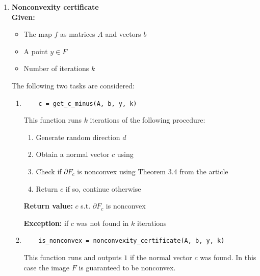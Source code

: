 \documentclass[a4paper]{article}
\theoremstyle{definition}
\begin{document}
\begin{enumerate}
\begin{enumerate}
{\bf Exception:} if optimization task failed

\item \begin{verbatim}
c = get_c_from_d(A, b, y, d)
\end{verbatim}

This function obtains the normal vector $c$ at the boundary point $y+td$ using dual problem (5) from the article.

{\bf Return value:} the normal vector $c$ s.t. $y+td\in\partial G_c$

{\bf Exception:} if optimization task failed
\end{enumerate}

\item {\bf Nonconvexity certificate}\\
{\bf Given:}
\begin{itemize}
	\item The map $f$ as matrices $A$ and vectors $b$
	\item A point $y\in F$
	\item Number of iterations $k$
\end{itemize}
The following two tasks are considered:
\begin{enumerate}
	\item \begin{verbatim}
	c = get_c_minus(A, b, y, k)
	\end{verbatim}
	This function runs $k$ iterations of the following procedure:
	\begin{enumerate}
		\item Generate random direction $d$
		\item Obtain a normal vector $c$ using 
		\item Check if $\partial F_c$ is nonconvex using Theorem 3.4 from the article
		\item Return $c$ if so, continue otherwise
	\end{enumerate}

	{\bf Return value:}  $c$ s.t. $\partial F_c$ is nonconvex
	
	{\bf Exception:} if $c$ was not found in $k$ iterations
	
	\item \begin{verbatim}
	is_nonconvex = nonconvexity_certificate(A, b, y, k)
	\end{verbatim}
	
	This function runs  and outputs $1$ if the normal vector $c$ was found. In this case the image $F$ is guaranteed to be nonconvex.
	

\end{enumerate}
\end{enumerate}
\end{document}
